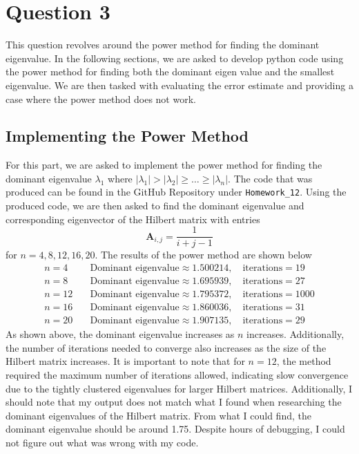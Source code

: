 \documentclass{article}
\begin{document}
\section{Question 3}
This question revolves around the power method for finding the dominant eigenvalue. In the following sections, we are asked to develop python code using the power method for finding both the dominant eigen value and the smallest eigenvalue. We are then tasked with evaluating the error estimate and providing a case where the power method does not work.

\subsection{Implementing the Power Method}
For this part, we are asked to implement the power method for finding the dominant eigenvalue \(\lambda_1\) where \(|\lambda_1| > |\lambda_2| \geq \dots \geq |\lambda_n|\). The code that was produced can be found in the GitHub Repository under \texttt{Homework\_12}. Using the produced code, we are then asked to find the dominant eigenvalue and corresponding eigenvector of the Hilbert matrix with entries
\[
\mathbf{A}_{i,j} = \frac{1}{i+j-1}
\]
for \(n = 4,8,12,16,20\). The results of the power method are shown below
\begin{align*}
n=4 &\quad \text{Dominant eigenvalue} \approx 1.500214, \quad \text{iterations} = 19 \\
n=8 &\quad \text{Dominant eigenvalue} \approx 1.695939, \quad \text{iterations} = 27 \\
n=12 &\quad \text{Dominant eigenvalue} \approx 1.795372, \quad \text{iterations} = 1000 \\
n=16 &\quad \text{Dominant eigenvalue} \approx 1.860036, \quad \text{iterations} = 31 \\
n=20 &\quad \text{Dominant eigenvalue} \approx 1.907135, \quad \text{iterations} = 29
\end{align*}
As shown above, the dominant eigenvalue increases as \(n\) increases. Additionally, the number of iterations needed to converge also increases as the size of the Hilbert matrix increases. It is important to note that for \(n=12\), the method required the maximum number of iterations allowed, indicating slow convergence due to the tightly clustered eigenvalues for larger Hilbert matrices. Additionally, I should note that my output does not match what I found when researching the dominant eigenvalues of the Hilbert matrix. From what I could find, the dominant eigenvalue should be around 1.75. Despite hours of debugging, I could not figure out what was wrong with my code.
\end{document}
